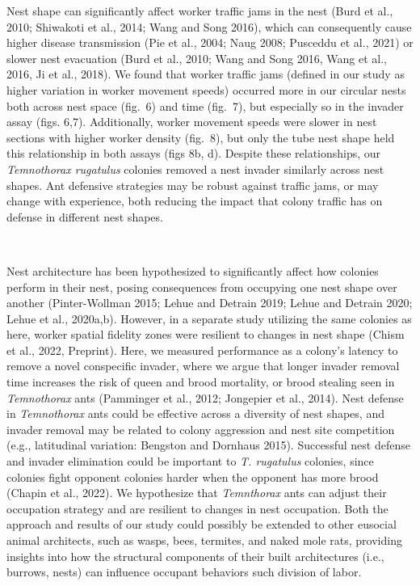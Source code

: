 \documentclass[3p]{elsarticle} %
\begin{document}
Nest shape can significantly affect worker traffic jams in the nest
(Burd et al., 2010; Shiwakoti et al., 2014; Wang and Song 2016), which
can consequently cause higher disease transmission (Pie et al., 2004;
Naug 2008; Pusceddu et al., 2021) or slower nest evacuation (Burd et
al., 2010; Wang and Song 2016, Wang et al., 2016, Ji et al., 2018). We
found that worker traffic jams (defined in our study as higher variation
in worker movement speeds) occurred more in our circular nests both
across nest space (fig.~6) and time (fig.~7), but especially so in the
invader assay (figs. 6,7). Additionally, worker movement speeds were
slower in nest sections with higher worker density (fig.~8), but only
the tube nest shape held this relationship in both assays (figs 8b, d).
Despite these relationships, our \emph{Temnothorax rugatulus} colonies
removed a nest invader similarly across nest shapes. Ant defensive
strategies may be robust against traffic jams, or may change with
experience, both reducing the impact that colony traffic has on defense
in different nest shapes.

~

Nest architecture has been hypothesized to significantly affect how
colonies perform in their nest, posing consequences from occupying one
nest shape over another (Pinter-Wollman 2015; Lehue and Detrain 2019;
Lehue and Detrain 2020; Lehue et al., 2020a,b). However, in a separate
study utilizing the same colonies as here, worker spatial fidelity zones
were resilient to changes in nest shape (Chism et al., 2022, Preprint).
Here, we measured performance as a colony's latency to remove a novel
conspecific invader, where we argue that longer invader removal time
increases the risk of queen and brood mortality, or brood stealing seen
in \emph{Temnothorax} ants (Pamminger et al., 2012; Jongepier et al.,
2014). Nest defense in \emph{Temnothorax} ants could be effective across
a diversity of nest shapes, and invader removal may be related to colony
aggression and nest site competition (e.g., latitudinal variation:
Bengston and Dornhaus 2015). Successful nest defense and invader
elimination could be important to \emph{T. rugatulus} colonies, since
colonies fight opponent colonies harder when the opponent has more brood
(Chapin et al., 2022). We hypothesize that \emph{Temnthorax} ants can
adjust their occupation strategy and are resilient to changes in nest
occupation. Both the approach and results of our study could possibly be
extended to other eusocial animal architects, such as wasps, bees,
termites, and naked mole rats, providing insights into how the
structural components of their built architectures (i.e., burrows,
nests) can influence occupant behaviors such division of labor.
\end{document}
